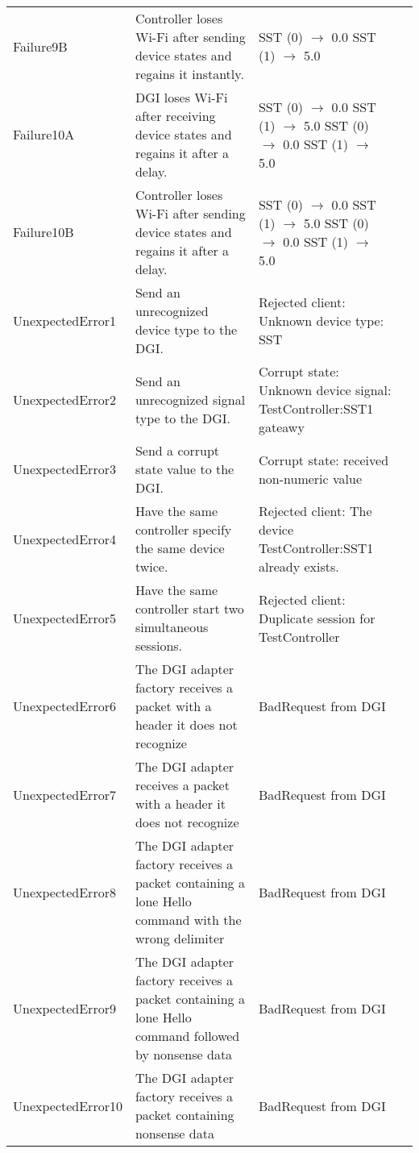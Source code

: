 \documentclass{article}
\begin{document}
\begin{center}
\begin{footnotesize}
\begin{longtable}{|p{3cm}|p{4cm}|p{10cm}|c|}
    Failure9B & Controller loses Wi-Fi after sending device states and regains it instantly. & SST (0) $\rightarrow$ 0.0 \newline SST (1) $\rightarrow$ 5.0 & \\
    Failure10A & DGI loses Wi-Fi after receiving device states and regains it after a delay. & SST (0) $\rightarrow$ 0.0 \newline SST (1) $\rightarrow$ 5.0 \newline SST (0) $\rightarrow$ 0.0 \newline SST (1) $\rightarrow$ 5.0 & \\
    Failure10B & Controller loses Wi-Fi after sending device states and regains it after a delay. & SST (0) $\rightarrow$ 0.0 \newline SST (1) $\rightarrow$ 5.0 \newline SST (0) $\rightarrow$ 0.0 \newline SST (1) $\rightarrow$ 5.0 & \\
    UnexpectedError1 & Send an unrecognized device type to the DGI. & Rejected client: Unknown device type: SST & \\
    UnexpectedError2 & Send an unrecognized signal type to the DGI. & Corrupt state: Unknown device signal: TestController:SST1 gateawy & \\
    UnexpectedError3 & Send a corrupt state value to the DGI. & Corrupt state: received non-numeric value & \\
    UnexpectedError4 & Have the same controller specify the same device twice. & Rejected client: The device TestController:SST1 already exists. & \\
    UnexpectedError5 & Have the same controller start two simultaneous sessions. & Rejected client: Duplicate session for TestController & \\
    UnexpectedError6 & The DGI adapter factory receives a packet with a header it does not recognize & BadRequest from DGI & \\
    UnexpectedError7 & The DGI adapter receives a packet with a header it does not recognize & BadRequest from DGI & \\
    UnexpectedError8 & The DGI adapter factory receives a packet containing a lone Hello command with the wrong delimiter & BadRequest from DGI & \\
    UnexpectedError9 & The DGI adapter factory receives a packet containing a lone Hello command followed by nonsense data & BadRequest from DGI & \\
    UnexpectedError10 & The DGI adapter factory receives a packet containing nonsense data & BadRequest from DGI  & \\

\end{longtable}
\end{footnotesize}
\end{center}
\end{document}
